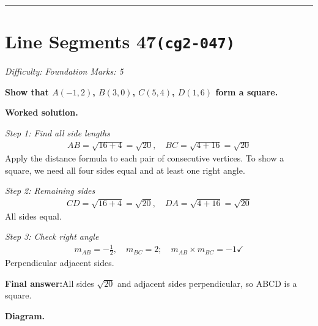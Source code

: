 \documentclass[11pt]{article}
\newcommand{\question}[1]{\par\medskip\noindent\textbf{#1}\par}
\begin{document}
\medskip\hrule

\section*{Line Segments 47\quad\small\texttt{(cg2-047)}}
\textit{Difficulty: Foundation \quad\textbar\quad Marks: 5}

\question{Show that \( A(-1, 2) \), \( B(3, 0) \), \( C(5, 4) \), \( D(1, 6) \) form a square.}

\textbf{Worked solution.}

\textit{Step 1: Find all side lengths}
\[\begin{gathered}
AB = \sqrt{16+4} = \sqrt{20}, \quad BC = \sqrt{4+16} = \sqrt{20}
\end{gathered}\]
Apply the distance formula to each pair of consecutive vertices. To show a square, we need all four sides equal and at least one right angle.

\textit{Step 2: Remaining sides}
\[\begin{gathered}
CD = \sqrt{16+4} = \sqrt{20}, \quad DA = \sqrt{4+16} = \sqrt{20}
\end{gathered}\]
All sides equal.

\textit{Step 3: Check right angle}
\[\begin{gathered}
m_{AB} = -\frac{1}{2}, \quad m_{BC} = 2; \quad m_{AB} \times m_{BC} = -1 \checkmark
\end{gathered}\]
Perpendicular adjacent sides.

\begin{answerbox}
\textbf{Final answer:}\quad All sides \(\displaystyle \sqrt{20}\) and adjacent sides perpendicular, so ABCD is a square.
\end{answerbox}
\textbf{Diagram.}
\end{document}
